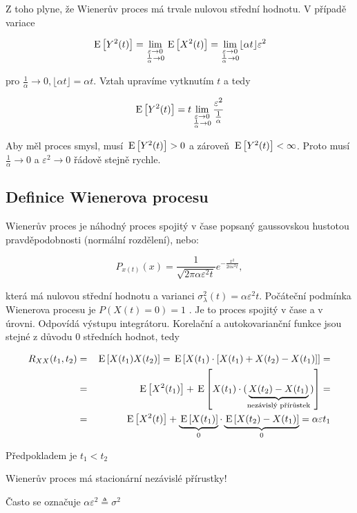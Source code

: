 Z toho plyne, že Wienerův proces má trvale nulovou střední hodnotu. V případě variace

\[ \,\mathrm{E}\left[Y^2(t)\right] = \lim_{\substack{\varepsilon\to 0\\ \frac{1}{\alpha}\to 0}} \,\mathrm{E}\left[X^2(t)\right]=\lim_{\substack{\varepsilon\to 0\\ \frac{1}{\alpha}\to 0}} \lfloor\alpha t\rfloor \varepsilon^2 \]

pro $\frac{1}{\alpha}\to 0, \lfloor\alpha t\rfloor=\alpha t$. Vztah upravíme vytknutím $t$ a tedy

\[ \,\mathrm{E}\left[Y^2(t)\right] = t \lim_{\substack{\varepsilon\to 0\\ \frac{1}{\alpha}\to 0}} \frac{\varepsilon^2}{\frac{1}{\alpha}} \]

Aby měl proces smysl, musí $\,\mathrm{E}\left[Y^2(t)\right]>0$ a zároveň $\,\mathrm{E}\left[Y^2(t)\right]<\infty$. Proto musí $\frac{1}{\alpha}\to 0$ a $\varepsilon^2\to 0$ řádově stejně rychle.

\subsection{Definice Wienerova procesu}
Wienerův proces je náhodný proces spojitý v čase popsaný gaussovskou hustotou pravděpodobnosti (normální rozdělení), nebo:

\[ P_{x(t)}(x)=\frac{1}{\sqrt{2\pi\alpha\varepsilon^2 t}}e^{-\frac{x^2}{2\alpha\varepsilon^2 t}}, \]

která má nulovou střední hodnotu a varianci $\sigma^2_\lambda(t) = \alpha\varepsilon^2 t$. Počáteční podmínka Wienerova procesu je $P(X(t)=0)=1$ . Je to proces spojitý v čase a v úrovni. Odpovídá výstupu integrátoru. Korelační a autokovarianční funkce jsou stejné z důvodu 0 středních hodnot, tedy

\begin{eqnarray*}
R_{XX}(t_1,t_2) &=&\,\mathrm{E}\left[X(t_1)X(t_2)\right] = \,\mathrm{E}\left[X(t_1)\cdot[X(t_1)+X(t_2)-X(t_1)]\right] = \\
& = & \,\mathrm{E}\left[X^2(t_1)\right] + \,\mathrm{E}\left[X(t_1)\cdot(\underbrace{X(t_2)-X(t_1)}_{\text{nezávislý přírůstek}})\right]= \\
& = & \,\mathrm{E}\left[X^2(t)\right]+\underbrace{\,\mathrm{E}\left[X(t_1)\right]}_0\cdot \underbrace{\,\mathrm{E}\left[X(t_2)-X(t_1)\right]}_0 = \alpha\varepsilon t_1
\end{eqnarray*}

Předpokladem je $t_1<t_2$

Wienerův proces má stacionární nezávislé přírustky!

Často se označuje $\alpha\varepsilon^2 \triangleq \sigma^2$


